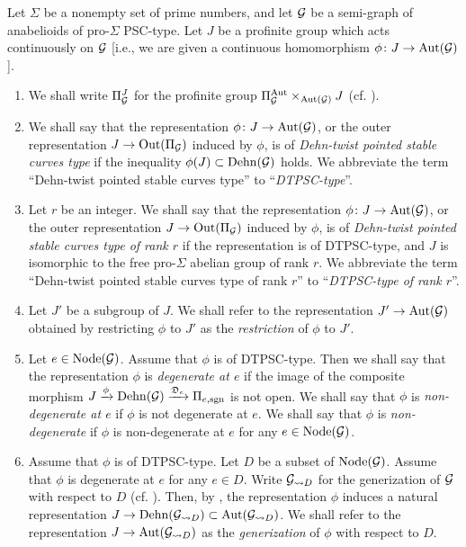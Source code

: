 \begin{defn}\label{DefnDTPSCtype}
  Let $\Sigma$ be a nonempty set of prime numbers, and let $\mathcal{G}$ be a semi-graph of anabelioids of pro-$\Sigma$ PSC-type. Let $J$ be a profinite group which acts continuously on $\mathcal{G}$ [i.e., we are given a continuous homomorphism $\phi \colon J \to \mathrm{Aut}(\mathcal{G})$].
  \begin{enumerate}
    \item We shall write $\Pi_{\mathcal{G}}^J$ for the profinite group $\Pi_{\mathcal{G}}^{\mathrm{Aut}} \times_{\mathrm{Aut}(\mathcal{G})} J$ (cf. \cite[Definition 2.3]{CmbGC}).
    \item We shall say that the representation $\phi \colon J \to \mathrm{Aut}(\mathcal{G})$, or the outer representation $J \to \mathrm{Out}(\Pi_{\mathcal{G}})$ induced by $\phi$, is of \emph{Dehn-twist pointed stable curves type} if the inequality $\phi(J) \subset \mathrm{Dehn}(\mathcal{G})$ holds. We abbreviate the term ``Dehn-twist pointed stable curves type'' to ``\emph{DTPSC-type}''.
    \item Let $r$ be an integer. We shall say that the representation $\phi \colon J \to \mathrm{Aut}(\mathcal{G})$, or the outer representation $J \to \mathrm{Out}(\Pi_{\mathcal{G}})$ induced by $\phi$, is of \emph{Dehn-twist pointed stable curves type of rank $r$} if the representation is of DTPSC-type, and $J$ is isomorphic to the free pro-$\Sigma$ abelian group of rank $r$. We abbreviate the term ``Dehn-twist pointed stable curves type of rank $r$'' to ``\emph{DTPSC-type of rank $r$}''.
    \item Let $J'$ be a subgroup of $J$. We shall refer to the representation $J' \to \mathrm{Aut}(\mathcal{G})$ obtained by restricting $\phi$ to $J'$ as the \emph{restriction} of $\phi$ to $J'$.
    \item Let $e \in \mathrm{Node}(\mathcal{G})$. Assume that $\phi$ is of DTPSC-type. Then we shall say that the representation $\phi$ is \emph{degenerate at $e$} if the image of the composite morphism $J \xrightarrow{\phi} \mathrm{Dehn}(\mathcal{G}) \xrightarrow{\mathfrak{D}_{e}} \Pi_{e, \mathrm{sgn}}$ is not open. We shall say that $\phi$ is \emph{non-degenerate at $e$} if $\phi$ is not degenerate at $e$. We shall say that $\phi$ is \emph{non-degenerate} if $\phi$ is non-degenerate at $e$ for any $e \in \mathrm{Node}(\mathcal{G})$.
    \item Assume that $\phi$ is of DTPSC-type. Let $D$ be a subset of $\mathrm{Node}(\mathcal{G})$. Assume that $\phi$ is degenerate at $e$ for any $e \in D$. Write $\mathcal{G}_{\leadsto D}$ for the generization of $\mathcal{G}$ with respect to $D$ (cf. \cite[Definition 2.8]{CbTpI}). Then, by \cite[Theorem 4.8, (ii)]{CbTpI}, the representation $\phi$ induces a natural representation $J \to \mathrm{Dehn}(\mathcal{G}_{\leadsto D}) \subset \mathrm{Aut}(\mathcal{G}_{\leadsto D})$. We shall refer to the representation $J \to \mathrm{Aut}(\mathcal{G}_{\leadsto D})$ as the \emph{generization} of $\phi$ with respect to $D$.
  \end{enumerate}
\end{defn}

